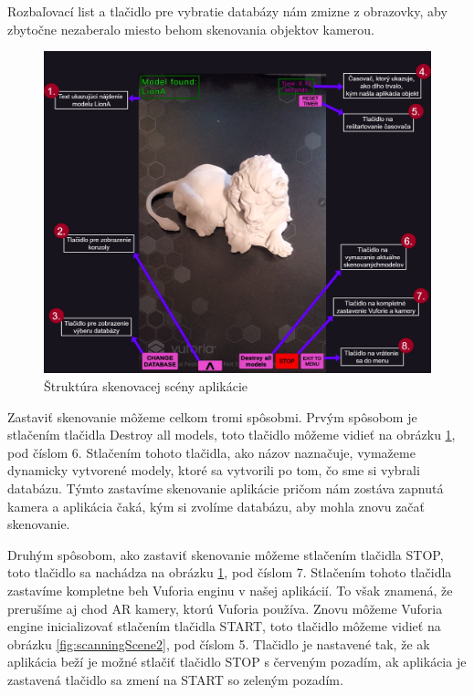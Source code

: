Rozbaľovací list a tlačidlo pre vybratie databázy nám zmizne z obrazovky, aby zbytočne nezaberalo miesto behom skenovania objektov kamerou. 

\begin{figure}[!h]
  \centering
  \includegraphics[width=1\textwidth]{img/Scanning_scene_part1.jpg}
  \caption{Štruktúra skenovacej scény aplikácie}
  \label{fig:scanningScene1}
\end{figure}

Zastaviť skenovanie môžeme celkom tromi spôsobmi. Prvým spôsobom je stlačením tlačidla Destroy all models, toto tlačidlo môžeme vidieť na obrázku \ref{fig:scanningScene1}, pod číslom 6. Stlačením tohoto tlačidla, ako názov naznačuje, vymažeme dynamicky vytvorené modely, ktoré sa vytvorili po tom, čo sme si vybrali databázu. Týmto zastavíme skenovanie aplikácie pričom nám zostáva zapnutá kamera a aplikácia čaká, kým si zvolíme databázu, aby mohla znovu začať skenovanie.

Druhým spôsobom, ako zastaviť skenovanie môžeme stlačením tlačidla STOP, toto tlačidlo sa nachádza na obrázku \ref{fig:scanningScene1}, pod číslom 7. Stlačením tohoto tlačidla zastavíme kompletne beh Vuforia enginu v našej aplikácií. To však znamená, že prerušíme aj chod AR kamery, ktorú Vuforia používa. Znovu môžeme Vuforia engine inicializovať stlačením tlačidla START, toto tlačidlo môžeme vidieť na obrázku \ref{fig:scanningScene2}, pod číslom 5. Tlačidlo je nastavené tak, že ak aplikácia beží je možné stlačiť tlačidlo STOP s červeným pozadím, ak aplikácia je zastavená tlačidlo sa zmení na START so zeleným pozadím.


